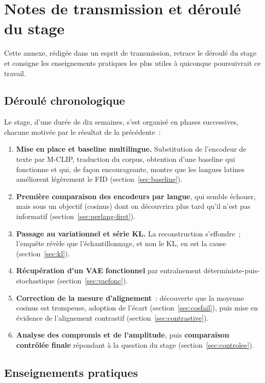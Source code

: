 \documentclass[12pt,a4paper,oneside]{report}
\theoremstyle{definition}
\theoremstyle{plain}
\begin{document}
\chapter{Notes de transmission et déroulé du stage}
\label{app:transmission}

Cette annexe, rédigée dans un esprit de transmission, retrace le déroulé du stage et
consigne les enseignements pratiques les plus utiles à quiconque poursuivrait ce
travail.

\section{Déroulé chronologique}

Le stage, d'une durée de dix semaines, s'est organisé en phases successives, chacune
motivée par le résultat de la
précédente~:

\begin{enumerate}[leftmargin=*]
\item \textbf{Mise en place et baseline multilingue.} Substitution de l'encodeur de
texte par M-CLIP, traduction du corpus, obtention d'une baseline qui fonctionne et
qui, de façon encourageante, montre que les langues latines améliorent légèrement le
FID (section~\ref{sec:baseline}).
\item \textbf{Première comparaison des encodeurs par langue}, qui semble échouer,
mais sous un objectif (cosinus) dont on découvrira plus tard qu'il n'est pas
informatif (section~\ref{sec:perlang-first}).
\item \textbf{Passage au variationnel et série KL.} La reconstruction s'effondre~;
l'enquête révèle que l'échantillonnage, et non le KL, en est la cause
(section~\ref{sec:kl}).
\item \textbf{Récupération d'un VAE fonctionnel} par entraînement
déterministe-puis-stochastique (section~\ref{sec:vaefonc}).
\item \textbf{Correction de la mesure d'alignement}~: découverte que la moyenne
cosinus est trompeuse, adoption de l'écart (section~\ref{sec:cosfail}), puis mise en
évidence de l'alignement contrastif (section~\ref{sec:contrastive}).
\item \textbf{Analyse des compromis et de l'amplitude}, puis \textbf{comparaison
contrôlée finale} répondant à la question du stage (section~\ref{sec:controlee}).
\end{enumerate}

\section{Enseignements pratiques}
\end{document}
